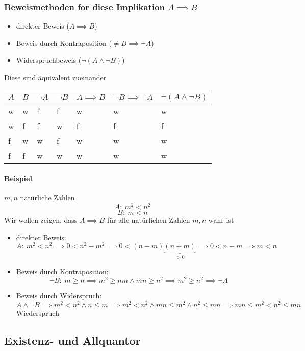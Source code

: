 \documentclass[a4paper]{scrartcl}
\theoremstyle{definition}
\theoremstyle{plain}
\theoremstyle{plain}
\theoremstyle{remark}
\theoremstyle{remark}
\theoremstyle{remark}
\theoremstyle{remark}
\theoremstyle{remark}
\begin{document}
\subsubsection{Beweismethoden for diese Implikation $A\implies B$}
\label{sec-2-2-2}
\begin{itemize}
\item direkter Beweis ($A\implies B$)
\item Beweis durch Kontraposition ($\neq B \implies \neg A$)
\item Widerspruchbeweis ($\neg (A\wedge \neg B)$)
\end{itemize}
Diese sind äquivalent zueinander
\begin{center}
\begin{tabular}{lllllll}
$A$ & $B$ & $\neg A$ & $\neg B$ & $A\implies B$ & $\neg B \implies \neg A$ & $\neg (A \wedge \neg B)$\\
\hline
w & w & f & f & w & w & w\\
w & f & f & w & f & f & f\\
f & w & w & f & w & w & w\\
f & f & w & w & w & w & w\\
\end{tabular}
\end{center}
\paragraph{Beispiel}
\label{sec-2-2-2-1}
$m,n$ natürliche Zahlen \\
     \[A:~m^2 < n^2\]
\[B:~m < n\]
Wir wollen zeigen, dass $A\implies B$ für alle natürlichen Zahlen $m,n$ wahr ist
\begin{itemize}
\item direkter Beweis: \\
       \[A:~m^2 < n^2 \implies 0 < n^2 - m^2 \implies 0 < (n-m)\underbrace{(n+m)}_{>0} \implies 0 < n-m \implies m<n\]
\item Beweis durch Kontraposition: \\
       \[\neg B:~m \geq n \implies m^2\geq n m \wedge m n \geq n^2 \implies m^2 \geq n^2 \implies \neg A\]
\item Beweis durch Widerspruch: \\
       \[A\wedge \neg B \implies m^2 < n^2 \wedge n\leq m \implies m^2 < n^2 \wedge m n \leq m^2 \wedge n^2 \leq m n \implies m n \leq m^2 < n^2 \leq m n\]
       Wiederspruch
\end{itemize}
\subsection{Existenz- und Allquantor}
\label{sec-2-3}
\end{document}
